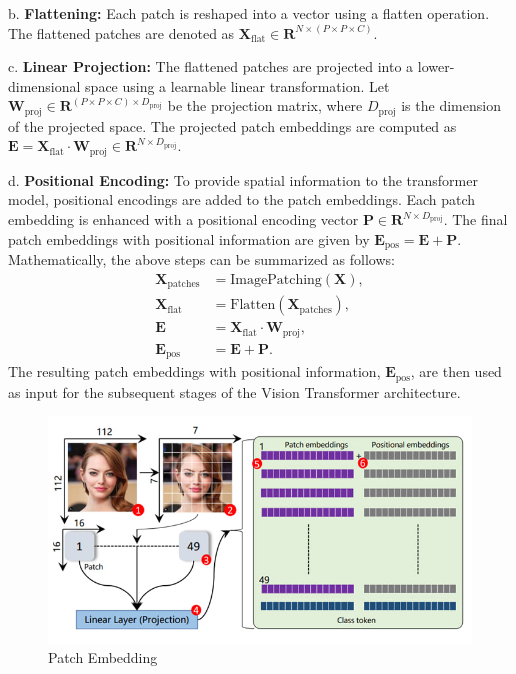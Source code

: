 \noindent b. \textbf{Flattening:} Each patch is reshaped into a vector using a flatten operation. The flattened patches are denoted as $\mathbf{X}_\text{flat} \in \mathbf{R}^{N \times (P \times P \times C)}$.

\noindent c. \textbf{Linear Projection:} The flattened patches are projected into a lower-dimensional space using a learnable linear transformation. Let $\mathbf{W}_\text{proj} \in \mathbf{R}^{(P \times P \times C) \times D_\text{proj}}$ be the projection matrix, where $D_\text{proj}$ is the dimension of the projected space. The projected patch embeddings are computed as $\mathbf{E} = \mathbf{X}_\text{flat} \cdot \mathbf{W}_\text{proj} \in \mathbf{R}^{N \times D_\text{proj}}$.

\noindent d. \textbf{Positional Encoding:} To provide spatial information to the transformer model, positional encodings are added to the patch embeddings. Each patch embedding is enhanced with a positional encoding vector $\mathbf{P} \in \mathbf{R}^{N \times D_\text{proj}}$. The final patch embeddings with positional information are given by $\mathbf{E}_\text{pos} = \mathbf{E} + \mathbf{P}$.\\

\noindent Mathematically, the above steps can be summarized as follows:
\begin{align}
    \mathbf{X}_\text{patches} & = \text{ImagePatching}(\mathbf{X}),                    \\
    \mathbf{X}_\text{flat}    & = \text{Flatten}(\mathbf{X}_\text{patches}),           \\
    \mathbf{E}                & = \mathbf{X}_\text{flat} \cdot \mathbf{W}_\text{proj}, \\
    \mathbf{E}_\text{pos}     & = \mathbf{E} + \mathbf{P}.
\end{align}
\noindent The resulting patch embeddings with positional information, $\mathbf{E}_\text{pos}$, are then used as input for the subsequent stages of the Vision Transformer architecture.


\begin{figure}[htbp]
    \centering
    \includegraphics[width=6in]{img/patchembedding.jpg}
    \caption{{Patch Embedding}}
\end{figure}

